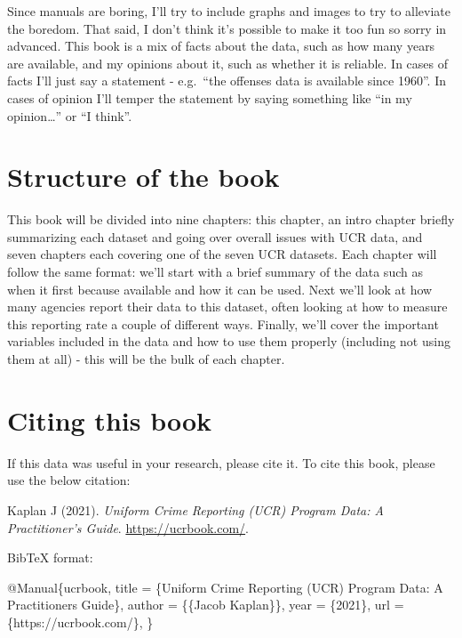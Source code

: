 \documentclass[
  12pt,
  openany]{book}
\newenvironment{Shaded}{\begin{snugshade}}{\end{snugshade}}
\newcommand{\DataTypeTok}[1]{\textcolor[rgb]{0.27,0.27,0.27}{#1}}
\newcommand{\NormalTok}[1]{#1}
\newcommand{\OtherTok}[1]{\textcolor[rgb]{0.37,0.37,0.37}{#1}}
\newcommand{\VariableTok}[1]{\textcolor[rgb]{0,0,0}{#1}}
\begin{document}
Since manuals are boring, I'll try to include graphs and images to try to alleviate the boredom. That said, I don't think it's possible to make it too fun so sorry in advanced. This book is a mix of facts about the data, such as how many years are available, and my opinions about it, such as whether it is reliable. In cases of facts I'll just say a statement - e.g.~``the offenses data is available since 1960''. In cases of opinion I'll temper the statement by saying something like ``in my opinion\ldots{}'' or ``I think''.

\hypertarget{structure-of-the-book}{%
\section{Structure of the book}\label{structure-of-the-book}}

This book will be divided into nine chapters: this chapter, an intro chapter briefly summarizing each dataset and going over overall issues with UCR data, and seven chapters each covering one of the seven UCR datasets. Each chapter will follow the same format: we'll start with a brief summary of the data such as when it first because available and how it can be used. Next we'll look at how many agencies report their data to this dataset, often looking at how to measure this reporting rate a couple of different ways. Finally, we'll cover the important variables included in the data and how to use them properly (including not using them at all) - this will be the bulk of each chapter.

\hypertarget{citing-this-book}{%
\section{Citing this book}\label{citing-this-book}}

If this data was useful in your research, please cite it. To cite this book, please use the below citation:

Kaplan J (2021). \emph{Uniform Crime Reporting (UCR) Program Data: A Practitioner's Guide}. \url{https://ucrbook.com/}.

BibTeX format:

\begin{Shaded}
\begin{Highlighting}[]
\VariableTok{@Manual}\NormalTok{\{}\OtherTok{ucrbook}\NormalTok{,}
  \DataTypeTok{title}\NormalTok{ = \{Uniform Crime Reporting (UCR) Program Data: A Practitioner\textquotesingle{}s Guide\},}
  \DataTypeTok{author}\NormalTok{ = \{\{Jacob Kaplan\}\},}
  \DataTypeTok{year}\NormalTok{ = \{2021\},}
  \DataTypeTok{url}\NormalTok{ = \{https://ucrbook.com/\},}
\NormalTok{\}}
\end{Highlighting}
\end{Shaded}
\end{document}
